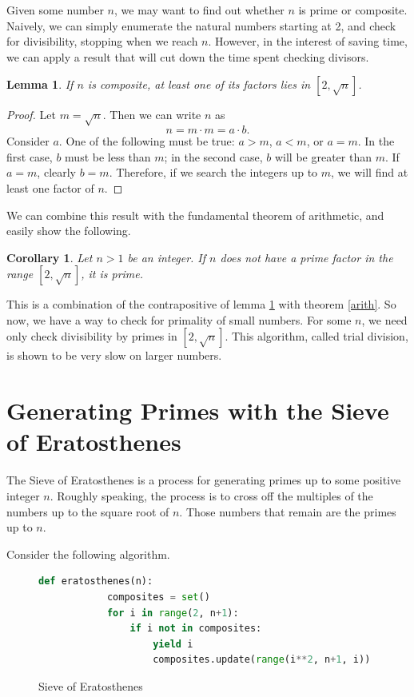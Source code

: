 \documentclass{amsart}
\newtheorem{lem}{Lemma}
\newtheorem{cor}{Corollary}
\theoremstyle{definition}
\theoremstyle{case}
\begin{document}
	Given some number $n$, we may want to find out whether $n$ is prime or composite. Naively, we can simply enumerate the natural numbers starting at 2, and check for divisibility, stopping when we reach $n$. However, in the interest of saving time, we can apply a result that will cut down the time spent checking divisors.
	\begin{lem}\label{sqrt}
		If $n$ is composite, at least one of its factors lies in $[2, \sqrt{n}]$.
	\end{lem}
	\begin{proof}
		Let $m = \sqrt{n}$. Then we can write $n$ as
		$$ n = m \cdot m = a \cdot b . $$
		Consider $a$. One of the following must be true: $a>m$, $a<m$, or $a=m$. In the first case, $b$ must be less than $m$; in the second case, $b$ will be greater than $m$. If $a=m$, clearly $b=m$. Therefore, if we search the integers up to $m$, we will find at least one factor of $n$.
	\end{proof}
	
	We can combine this result with the fundamental theorem of arithmetic, and easily show the following.
	\begin{cor}\label{corprime}
		Let $n>1$ be an integer. If $n$ does not have a prime factor in the range $[2, \sqrt{n}]$, it is prime.
	\end{cor}
	This is a combination of the contrapositive of lemma \ref{sqrt} with theorem \ref{arith}. So now, we have a way to check for primality of small numbers. For some $n$, we need only check divisibility by primes in $[2, \sqrt{n}]$. This algorithm, called trial division, is shown to be very slow on larger numbers. 
	
	
	
	\section{Generating Primes with the Sieve of Eratosthenes}
	
	The Sieve of Eratosthenes is a process for generating primes up to some positive integer $n$. Roughly speaking, the process is to cross off the multiples of the numbers up to the square root of $n$. Those numbers that remain are the primes up to $n$.
	
	Consider the following algorithm.
	
	\begin{figure}[H]\caption{Sieve of Eratosthenes}
		\begin{lstlisting}[language=Python]
		def eratosthenes(n):
		    composites = set()
		    for i in range(2, n+1):
		        if i not in composites:
		            yield i
		            composites.update(range(i**2, n+1, i))
		\end{lstlisting}
	\end{figure}
	
\end{document}
